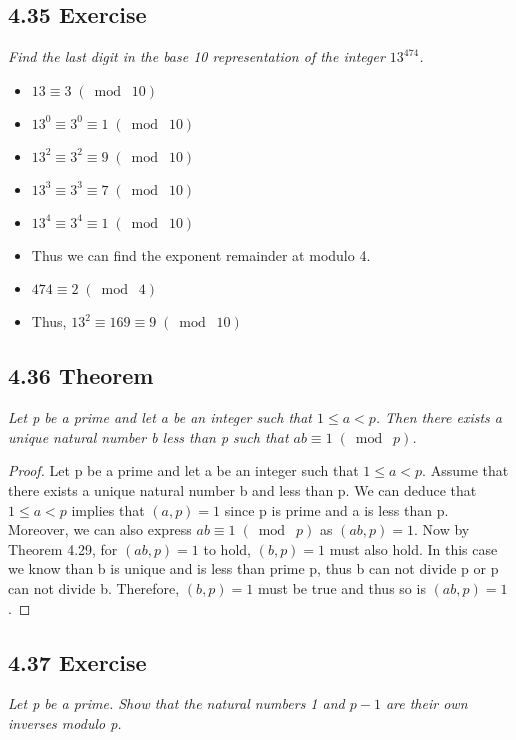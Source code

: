 \documentclass{article}
\begin{document}
\subsection*{4.35 Exercise} 
\quad \textit{Find the last digit in the base 10 representation of the integer $13^{474}$.}

\begin{itemize}
    \item $13 \equiv 3 \;(\bmod\; 10)$
    \item $13^0 \equiv 3^0 \equiv 1 \;(\bmod\; 10)$
    \item $13^2 \equiv 3^2 \equiv 9 \;(\bmod\; 10)$
    \item $13^3 \equiv 3^3 \equiv 7 \;(\bmod\; 10)$
    \item $13^4 \equiv 3^4 \equiv 1 \;(\bmod\; 10)$
    \item Thus we can find the exponent remainder at modulo 4.
    \item $474 \equiv 2 \;(\bmod\; 4)$
    \item Thus, $13^2 \equiv 169 \equiv 9 \;(\bmod\; 10)$
\end{itemize}

\subsection*{4.36 Theorem} 
\quad \textit{Let p be a prime and let a be an integer such that $1 \leq a < p$. Then there exists a unique natural number b less than p such that $ab \equiv 1 \;(\bmod\; p)$.}

\begin{proof}
Let p be a prime and let a be an integer such that $1 \leq a < p$. Assume that there exists a unique natural number b and less than p. We can deduce that $1 \leq a < p$ implies that $(a, p) = 1$ since p is prime and a is less than p. Moreover, we can also express $ab \equiv 1 \;(\bmod\; p)$ as $(ab, p) = 1$. Now by Theorem 4.29, for $(ab, p) = 1$ to hold, $(b, p) = 1$ must also hold. In this case we know than b is unique and is less than prime p, thus b can not divide p or p can not divide b. Therefore, $(b, p) = 1$ must be true and thus so is $(ab, p) = 1$.
\end{proof}

\subsection*{4.37 Exercise} 
\quad \textit{Let p be a prime. Show that the natural numbers 1 and $p-1$ are their own inverses modulo p.}
\end{document}
